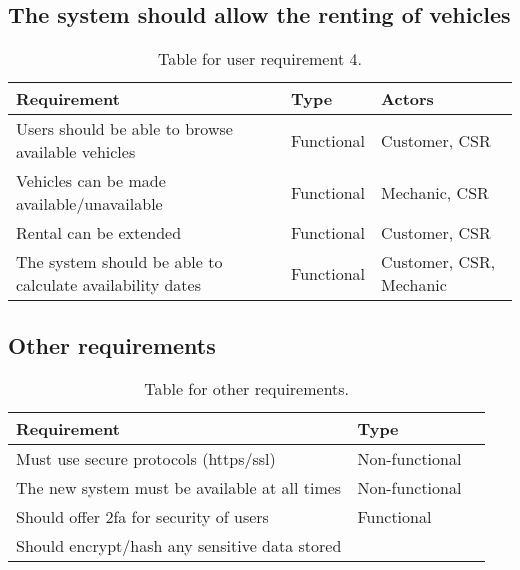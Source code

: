  \subsection{The system should allow the renting of vehicles}
    \begin{table}[H]
      \centering
      \begin{tabular}{|p{}|p{}|p{}|}
        \hline
        Requirement & Type & Actors \\ \hline
        Users should be able to browse available vehicles & Functional & Customer, CSR \\ \hline
        Vehicles can be made available/unavailable & Functional & Mechanic, CSR \\ \hline
        Rental can be extended & Functional & Customer, CSR \\ \hline
        The system should be able to calculate availability dates & Functional & Customer, CSR, Mechanic \\ \hline
      \end{tabular}
      \caption{Table for user requirement 4.}
    \end{table}
  
  \subsection{Other requirements}
    \begin{table}[H]
      \centering
      \begin{tabular}{|p{}|p{}|p{}|}
        \hline
        Requirement & Type \\ \hline
        Must use secure protocols (https/ssl) & Non-functional \\ \hline
        The new system must be available at all times & Non-functional \\ \hline
        Should offer 2fa for security of users & Functional \\ \hline
        Should encrypt/hash any sensitive data stored \\ \hline
      \end{tabular}
      \caption{Table for other requirements.}
    \end{table}

\newpage